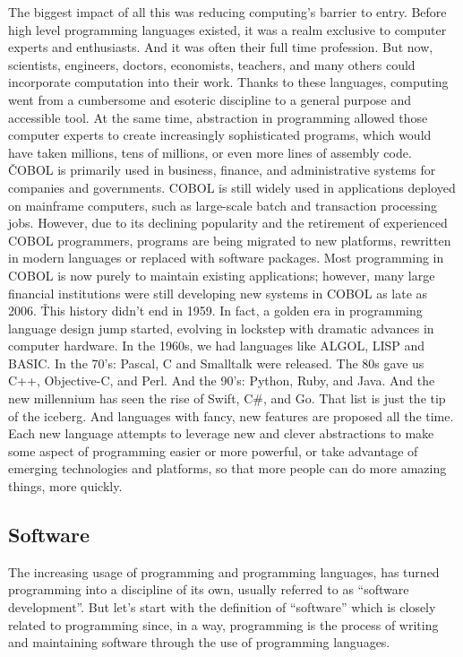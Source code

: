 The biggest impact of all this was reducing computing's barrier to entry. Before high level programming languages
existed, it was a realm exclusive to computer experts and enthusiasts. And it was often their full time profession.
But now, scientists, engineers, doctors, economists, teachers, and many others could incorporate computation into
their work. Thanks to these languages, computing went from a cumbersome and esoteric discipline to a general purpose
and accessible tool. At the same time, abstraction in programming allowed those computer experts to create
increasingly sophisticated programs, which would have taken millions, tens of millions, or even more lines of
assembly code. \v

COBOL is primarily used in business, finance, and administrative systems for companies and governments. COBOL is
still widely used in applications deployed on mainframe computers, such as large-scale batch and transaction
processing jobs. However, due to its declining popularity and the retirement of experienced COBOL programmers,
programs are being migrated to new platforms, rewritten in modern languages or replaced with software packages. Most
programming in COBOL is now purely to maintain existing applications; however, many large financial institutions were
still developing new systems in COBOL as late as 2006. \v

This history didn't end in 1959. In fact, a golden era in programming language design jump started, evolving in
lockstep with dramatic advances in computer hardware. In the 1960s, we had languages like ALGOL, LISP and BASIC. In
the 70's: Pascal, C and Smalltalk were released. The 80s gave us C++, Objective-C, and Perl. And the 90's: Python,
Ruby, and Java. And the new millennium has seen the rise of Swift, C\#, and Go. That list is just the tip of the
iceberg. And languages with fancy, new features are proposed all the time. Each new language attempts to leverage new
and clever abstractions to make some aspect of programming easier or more powerful, or take advantage of emerging
technologies and platforms, so that more people can do more amazing things, more quickly.

\subsection{Software}

The increasing usage of programming and programming languages, has turned programming into a discipline of its own,
usually referred to as ``software development''. But let's start with the definition of ``software'' which is closely
related to programming since, in a way, programming is the process of writing and maintaining software through the use
of programming languages.


